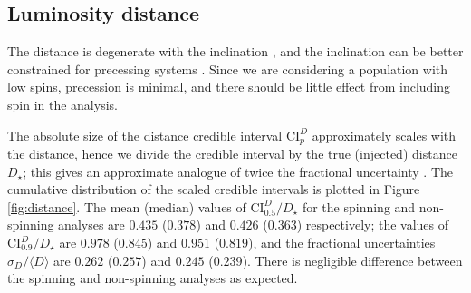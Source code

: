 \subsection{Luminosity distance}\label{sec:distance}

The distance is degenerate with the inclination \citep{Cutler_1994,Aasi_2013}, and the inclination can be better constrained for precessing systems \citep{van_der_Sluys_2008,Vitale_2014}. Since we are considering a population with low spins, precession is minimal, and there should be little effect from including spin in the analysis.

The absolute size of the distance credible interval $\mathrm{CI}_p^{D}$ approximately scales with the distance, hence we divide the credible interval by the true (injected) distance $D_\star$; this gives an approximate analogue of twice the fractional uncertainty \citep{Berry_2014}. The cumulative distribution of the scaled credible intervals is plotted in Figure \ref{fig:distance}. The mean (median) values of $\mathrm{CI}_{0.5}^{D}/D_\star$ for the spinning and non-spinning analyses are $0.435$ ($0.378$) and $0.426$ ($0.363$) respectively; the values of $\mathrm{CI}_{0.9}^{D}/D_\star$ are $0.978$ ($0.845$) and $0.951$ ($0.819$), and the fractional uncertainties $\sigma_D/\langle D\rangle$ are $0.262$ ($0.257$) and $0.245$ ($0.239$). There is negligible difference between the spinning and non-spinning analyses as expected.


  
  
  
  